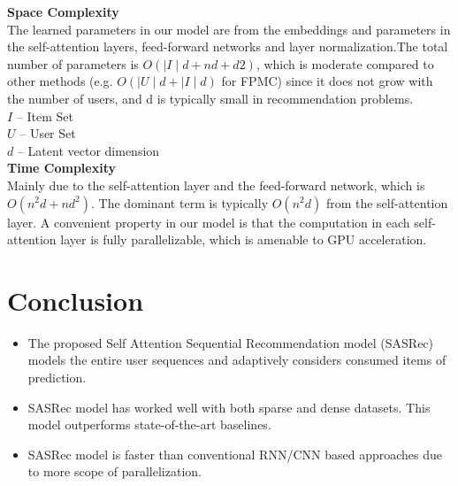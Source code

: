 \documentclass[11pt]{article}
\begin{document}
		\textbf{Space Complexity }\\ 
		\quad The learned parameters in our model
are from the embeddings and parameters in the self-attention
layers, feed-forward networks and layer normalization.The total number of parameters is $O(\mid I \mid d + nd + d2)$, which is moderate compared to other methods (e.g. $O(\mid U \mid d + \mid I \mid d)$ for FPMC) since it does not grow with the number of users, and d is typically small in recommendation problems.\\$I$ – Item Set \\$U$ – User Set \\$d$ – Latent vector dimension \\

 \textbf{Time Complexity} \\
		Mainly due to the self-attention layer and the feed-forward network, which is $O(n^{2}d + nd^{2})$. The dominant term is typically $O(n^{2}d)$ from the self-attention layer. A convenient property in our model is that the computation in each self-attention layer is fully parallelizable, which is amenable to GPU acceleration.

\section{Conclusion}

\begin{itemize}
\item The proposed Self Attention Sequential Recommendation model (SASRec) models the entire user sequences and adaptively considers consumed items of prediction. 
\item SASRec model has worked well with both sparse and dense datasets. This model outperforms state-of-the-art baselines. 
\item SASRec model is faster than conventional RNN/CNN based approaches due to more scope of parallelization.

\end{itemize}
\end{document}
